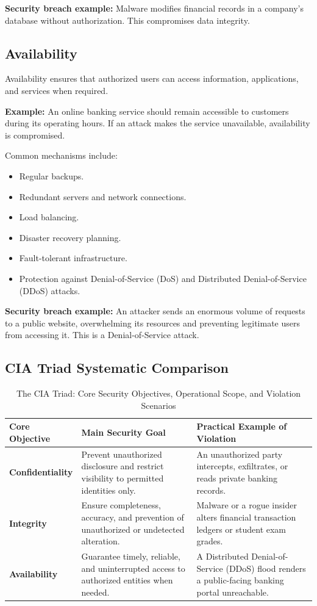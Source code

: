 \textbf{Security breach example:} Malware modifies financial records in a company's database without authorization. This compromises data integrity.

\subsection{Availability}

Availability ensures that authorized users can access information, applications, and services when required.

\textbf{Example:} An online banking service should remain accessible to customers during its operating hours. If an attack makes the service unavailable, availability is compromised.

Common mechanisms include:

\begin{itemize}
\item Regular backups.
\item Redundant servers and network connections.
\item Load balancing.
\item Disaster recovery planning.
\item Fault-tolerant infrastructure.
\item Protection against Denial-of-Service (DoS) and Distributed Denial-of-Service (DDoS) attacks.
\end{itemize}

\textbf{Security breach example:} An attacker sends an enormous volume of requests to a public website, overwhelming its resources and preventing legitimate users from accessing it. This is a Denial-of-Service attack.

\subsection{CIA Triad Systematic Comparison}

\begin{table}[htbp]
\centering
\caption{The CIA Triad: Core Security Objectives, Operational Scope, and Violation Scenarios}
\label{tab:cia_triad_comparison}
\begin{tabularx}{\textwidth}{p{3.2cm} p{5.2cm} X}
\toprule
\textbf{Core Objective} & \textbf{Main Security Goal} & \textbf{Practical Example of Violation} \\
\midrule
\textbf{Confidentiality} & Prevent unauthorized disclosure and restrict visibility to permitted identities only. & An unauthorized party intercepts, exfiltrates, or reads private banking records. \\
\textbf{Integrity} & Ensure completeness, accuracy, and prevention of unauthorized or undetected alteration. & Malware or a rogue insider alters financial transaction ledgers or student exam grades. \\
\textbf{Availability} & Guarantee timely, reliable, and uninterrupted access to authorized entities when needed. & A Distributed Denial-of-Service (DDoS) flood renders a public-facing banking portal unreachable. \\
\bottomrule
\end{tabularx}
\end{table}


